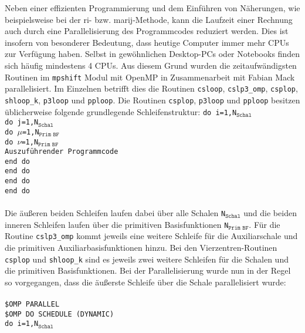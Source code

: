 \bigskip
Neben einer effizienten Programmierung und dem Einführen von Näherungen, wie beispielsweise bei der \ac{ri}- bzw. \ac{marij}-Methode, kann die Laufzeit einer Rechnung auch durch eine Parallelisierung des Programmcodes reduziert werden. Dies ist insofern von besonderer Bedeutung, dass heutige Computer immer mehr CPUs zur Verfügung haben. Selbst in gewöhnlichen Desktop-PCs oder Notebooks finden sich häufig mindestens 4 CPUs. Aus diesem Grund wurden die zeitaufwändigsten Routinen im \texttt{mpshift} Modul mit OpenMP\supercite{dagum1998openmp} in Zusammenarbeit mit Fabian Mack parallelisiert. Im Einzelnen betrifft dies die Routinen \texttt{csloop}, \texttt{cslp3\_omp}, \texttt{csplop}, \texttt{shloop\_k}, \texttt{p3loop} und \texttt{pploop}. Die Routinen \texttt{csplop}, \texttt{p3loop} und \texttt{pploop} besitzen üblicherweise folgende grundlegende Schleifenstruktur:
\vfill
\newpage
\texttt{do i=1,N$_{\texttt{Schal}}$}\\ 
\null\quad\texttt{do j=1,N$_{\texttt{Schal}}$}\\ 
\null\quad\quad\texttt{do $\mu$=1,N$_{\texttt{Prim BF}}$}\\ 
\null\quad\quad\quad\texttt{do $\nu$=1,N$_{\texttt{Prim BF}}$}\\
\null\quad\quad\quad\quad \texttt{Auszuführender Programmcode}\\ 
\null\quad\quad\quad\texttt{end do}\\ 
\null\quad\quad\texttt{end do}\\ 
\null\quad\texttt{end do}\\ 
\texttt{end do}\\
\\
Die äußeren beiden Schleifen laufen dabei über alle Schalen \texttt{N}$_{\texttt{Schal}}$ und die beiden inneren Schleifen laufen über die primitiven Basisfunktionen \texttt{N}$_{\texttt{Prim BF}}$. Für die Routine \texttt{cslp3\_omp} kommt jeweils eine weitere Schleife für die Auxiliarschale und die primitiven Auxiliarbasisfunktionen hinzu. Bei den Vierzentren-Routinen \texttt{csplop} und \texttt{shloop\_k} sind es jeweils zwei weitere Schleifen für die Schalen und die primitiven Basisfunktionen. Bei der Parallelisierung wurde nun in der Regel so vorgegangen, dass die äußerste Schleife über die Schale parallelisiert wurde:\\
\\
\texttt{\$OMP PARALLEL}\\
\texttt{\$OMP DO SCHEDULE (DYNAMIC)}\\
\texttt{do i=1,N$_{\texttt{Schal}}$}\\ 
